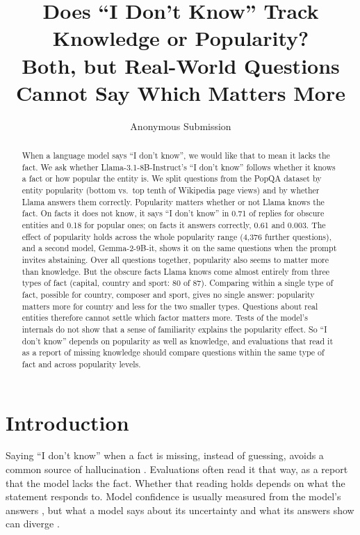 \documentclass[letterpaper]{article} %
\title{Does ``I Don't Know'' Track Knowledge or Popularity?\\Both, but Real-World Questions Cannot Say Which Matters More}
\author{
    Anonymous Submission
}
\newcommand{\idk}{``I don't know''}
\begin{document}
\maketitle

\begin{abstract}
When a language model says \idk, we would like that to mean it lacks the fact. We ask whether Llama-3.1-8B-Instruct's \idk{} follows whether it knows a fact or how popular the entity is. We split questions from the PopQA dataset by entity popularity (bottom vs.\ top tenth of Wikipedia page views) and by whether Llama answers them correctly. Popularity matters whether or not Llama knows the fact. On facts it does not know, it says \idk{} in 0.71 of replies for obscure entities and 0.18 for popular ones; on facts it answers correctly, 0.61 and 0.003. The effect of popularity holds across the whole popularity range (4,376 further questions), and a second model, Gemma-2-9B-it, shows it on the same questions when the prompt invites abstaining. Over all questions together, popularity also seems to matter more than knowledge. But the obscure facts Llama knows come almost entirely from three types of fact (capital, country and sport: 80 of 87). Comparing within a single type of fact, possible for country, composer and sport, gives no single answer: popularity matters more for country and less for the two smaller types. Questions about real entities therefore cannot settle which factor matters more. Tests of the model's internals do not show that a sense of familiarity explains the popularity effect. So \idk{} depends on popularity as well as knowledge, and evaluations that read it as a report of missing knowledge should compare questions within the same type of fact and across popularity levels.
\end{abstract}

\section{Introduction}

Saying \idk{} when a fact is missing, instead of guessing, avoids a common source of hallucination \citep{kalai2025hallucinate}. Evaluations often read it that way, as a report that the model lacks the fact. Whether that reading holds depends on what the statement responds to. Model confidence is usually measured from the model's answers \citep{kadavath2022know,kuhn2023semantic}, but what a model says about its uncertainty and what its answers show can diverge \citep{ji2025calibrating}.
\end{document}
